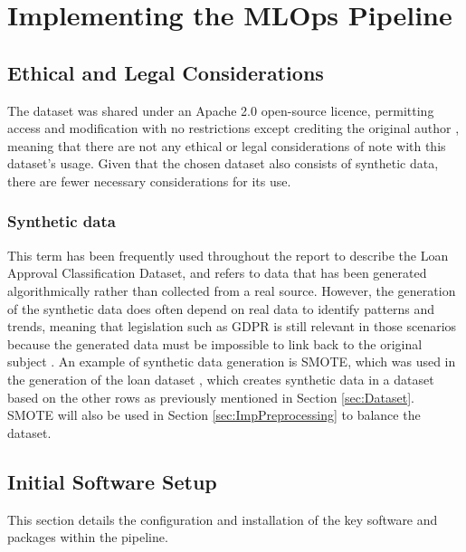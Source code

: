 \documentclass[12pt]{report}
\begin{document}
\chapter{Implementing the MLOps Pipeline}
\section{Ethical and Legal Considerations}
The dataset was shared under an Apache 2.0 open-source licence, permitting access and modification with no restrictions
except crediting the original author \autocite{apache_apache_nodate}, meaning that there are not any ethical or legal 
considerations of note with this dataset's usage. Given that the chosen dataset also consists of synthetic data,
there are fewer necessary considerations for its use.

\subsection{Synthetic data}
This term has been frequently used throughout the report to describe the Loan Approval Classification Dataset, and refers to 
data that has been generated algorithmically rather than collected from a real source. However, the generation of the 
synthetic data does often depend on real data to identify patterns and trends, meaning that legislation such as GDPR is still relevant
in those scenarios because the generated data must be impossible to link back to the original subject \autocite{Lopez2022OnTL}.
An example of synthetic data generation is SMOTE, which was used in the generation of the loan dataset \autocite{zoppelleto_financial_nodate}, 
which creates synthetic data in a dataset based on the other rows as previously mentioned in Section \ref{sec:Dataset}. SMOTE will also be used in Section 
\ref{sec:ImpPreprocessing} to balance the dataset.





\section{Initial Software Setup}
This section details the configuration and installation of the key software and packages within the pipeline.
\end{document}
